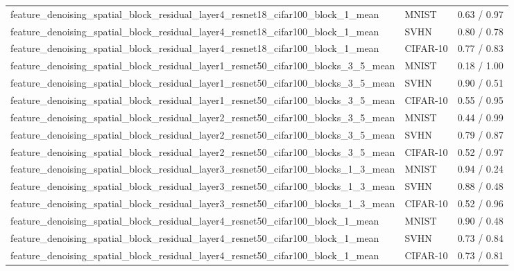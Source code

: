 \begin{tabular}{lll}
feature\_denoising\_spatial\_block\_residual\_layer4\_resnet18\_cifar100\_block\_1\_mean & MNIST & 0.63 / 0.97 \\
feature\_denoising\_spatial\_block\_residual\_layer4\_resnet18\_cifar100\_block\_1\_mean & SVHN & 0.80 / 0.78 \\
feature\_denoising\_spatial\_block\_residual\_layer4\_resnet18\_cifar100\_block\_1\_mean & CIFAR-10 & 0.77 / 0.83 \\
feature\_denoising\_spatial\_block\_residual\_layer1\_resnet50\_cifar100\_blocks\_3\_5\_mean & MNIST & 0.18 / 1.00 \\
feature\_denoising\_spatial\_block\_residual\_layer1\_resnet50\_cifar100\_blocks\_3\_5\_mean & SVHN & 0.90 / 0.51 \\
feature\_denoising\_spatial\_block\_residual\_layer1\_resnet50\_cifar100\_blocks\_3\_5\_mean & CIFAR-10 & 0.55 / 0.95 \\
feature\_denoising\_spatial\_block\_residual\_layer2\_resnet50\_cifar100\_blocks\_3\_5\_mean & MNIST & 0.44 / 0.99 \\
feature\_denoising\_spatial\_block\_residual\_layer2\_resnet50\_cifar100\_blocks\_3\_5\_mean & SVHN & 0.79 / 0.87 \\
feature\_denoising\_spatial\_block\_residual\_layer2\_resnet50\_cifar100\_blocks\_3\_5\_mean & CIFAR-10 & 0.52 / 0.97 \\
feature\_denoising\_spatial\_block\_residual\_layer3\_resnet50\_cifar100\_blocks\_1\_3\_mean & MNIST & 0.94 / 0.24 \\
feature\_denoising\_spatial\_block\_residual\_layer3\_resnet50\_cifar100\_blocks\_1\_3\_mean & SVHN & 0.88 / 0.48 \\
feature\_denoising\_spatial\_block\_residual\_layer3\_resnet50\_cifar100\_blocks\_1\_3\_mean & CIFAR-10 & 0.52 / 0.96 \\
feature\_denoising\_spatial\_block\_residual\_layer4\_resnet50\_cifar100\_block\_1\_mean & MNIST & 0.90 / 0.48 \\
feature\_denoising\_spatial\_block\_residual\_layer4\_resnet50\_cifar100\_block\_1\_mean & SVHN & 0.73 / 0.84 \\
feature\_denoising\_spatial\_block\_residual\_layer4\_resnet50\_cifar100\_block\_1\_mean & CIFAR-10 & 0.73 / 0.81 \\
\bottomrule
\end{tabular}
